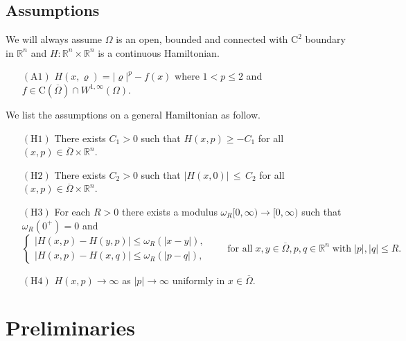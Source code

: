 \documentclass[11pt,reqno]{amsart}
\numberwithin{figure}{section}
\theoremstyle{plain}
\theoremstyle{remark}
\numberwithin{equation}{section}
\begin{document}
\subsection{Assumptions} We will always assume $\Omega$ is an open, bounded and connected with $\mathrm{C}^2$ boundary in $\mathbb{R}^n$ and $H:\mathbb{R}^n\times \mathbb{R}^n$ is a continuous Hamiltonian. 
\begin{itemize}
    \item[$\mathrm{(A1)}$] $H(x,\varrho) = |\varrho|^p - f(x)$ where $1<p\leq 2$ and $f\in \mathrm{C}(\overline{\Omega})\cap W^{1,\infty}(\Omega)$.
\end{itemize}
We list the assumptions on a general Hamiltonian as follow.
\begin{itemize}
    \item[$\mathrm{(H1)}$] There exists $C_1 > 0$ such that $H(x,p) \geq -C_1$ for all $(x,p)\in \overline{\Omega}\times\mathbb{R}^n$.
    \item[$\mathrm{(H2)}$] There exists $C_2>0$ such that $|H(x,0)|\,\leq \,C_2$ for all $(x,p)\in \overline{\Omega}\times \mathbb{R}^n$.
    \item[$\mathrm{(H3)}$] For each $R>0$ there exists a modulus $\omega_{R}[0,\infty)\to [0,\infty)$ such that $\omega_R(0^+) = 0$ and 
    \begin{equation*}
        \begin{cases}
        |H(x,p) - H(y,p)| \leq \omega_R(|x-y|),\\
        |H(x,p) - H(x,q)| \leq \omega_R(|p-q|),
        \end{cases} \qquad\text{for all}\;x,y\in \overline{\Omega}, p,q \in \mathbb{R}^n\;\text{with}\;|p|,|q|\leq R.
    \end{equation*}
    \item[$\mathrm{(H4)}$] $H(x,p)\rightarrow \infty$ as $|p|\to \infty$ uniformly in $x\in \overline{\Omega}$.
\end{itemize}

\section{Preliminaries}\label{sec:prelim} 
\end{document}
